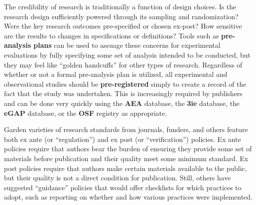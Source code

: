 The credibility of research is traditionally a function of design choices.\cite{angrist2010credibility,ioannidis2005most}
Is the research design sufficiently powered through its sampling and randomization?
Were the key research outcomes pre-specified or chosen ex-post?
How sensitive are the results to changes in specifications or definitions?
Tools such as \textbf{pre-analysis plans}
can be used to assuage these concerns for experimental evaluations
by fully specifying some set of analysis intended to be conducted,
but they may feel like ``golden handcuffs'' for other types of research.\cite{olken2015promises}
Regardless of whether or not a formal pre-analysis plan is utilized,
all experimental and observational studies should be \textbf{pre-registered}
simply to create a record of the fact that the study was undertaken.
This is increasingly required by publishers and can be done very quickly
using the \textbf{AEA} database,
the \textbf{3ie} database,
the \textbf{eGAP} database,
or the \textbf{OSF} registry as appropriate.

Garden varieties of research standards from journals, funders, and others feature both ex ante
(or ``regulation'') and ex post (or ``verification'') policies.\cite{stodden2013toward}
Ex ante policies require that authors bear the burden
of ensuring they provide some set of materials before publication
and their quality meet some minimum standard.
Ex post policies require that authors make certain materials available to the public,
but their quality is not a direct condition for publication.
Still, others have suggested ``guidance'' policies that would offer checklists
for which practices to adopt, such as reporting on whether and how
various practices were implemented.\cite{nosek2015promoting}

